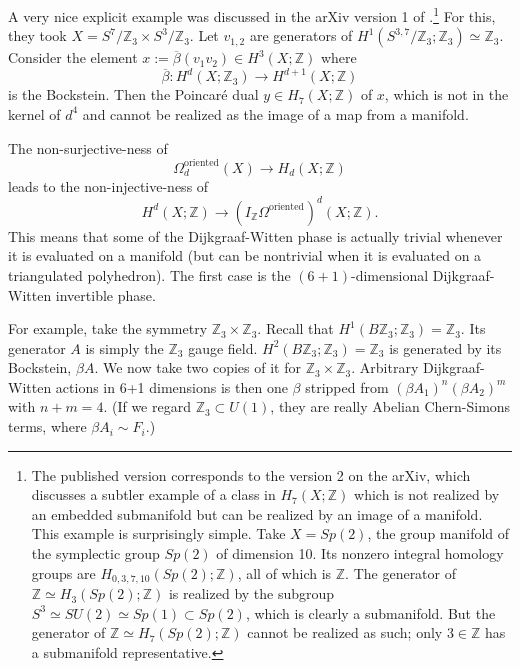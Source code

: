 \documentclass[12pt]{article}
\numberwithin{equation}{section}
\numberwithin{figure}{section}
\theoremstyle{remark}
\def\bZ{\mathbb{Z}}
\let\bar\overline
\def\BZ{\bZ}
\begin{document}
A very nice explicit example was discussed in the arXiv version 1 of \cite{BHK}.\footnote{%
The published version corresponds to the version 2 on the arXiv,
which discusses a subtler example of a class in $H_7(X;\bZ)$ which is not realized by an embedded submanifold
but can be realized by an image of a manifold.
This example is surprisingly simple. Take $X=Sp(2)$, the group manifold of the symplectic group $Sp(2)$ of dimension 10.
Its nonzero integral homology groups are $H_{0,3,7,10}(Sp(2);\bZ)$, all of which is $\bZ$.
The generator of $\bZ\simeq H_3(Sp(2);\bZ)$ is realized by the subgroup $S^3\simeq SU(2)\simeq Sp(1)\subset Sp(2)$,
which is clearly a submanifold.
But the generator of $\bZ\simeq H_7(Sp(2);\bZ)$ cannot be realized as such; only $3\in \bZ$ has a submanifold representative.
}
For this, they took $X=S^7/\bZ_3 \times S^3/\bZ_3$.
Let  $v_{1,2}$ are generators of $H^1(S^{3,7}/\bZ_3;\bZ_3)\simeq \bZ_3$.
Consider the element $x:=\bar\beta(v_1v_2)\in H^3(X;\bZ)$ where 
\begin{equation}
\bar\beta\colon H^d(X;\bZ_3)\to H^{d+1}(X;\bZ)
\end{equation} is the Bockstein.
Then the Poincar\'e dual $y\in H_7(X;\bZ)$ of $x$, which is not in the kernel of $d^4$ and cannot be realized 
as  the image of a map from a manifold.

The non-surjective-ness of 
\begin{equation}
\Omega^\text{oriented}_d(X)\to H_d(X;\bZ)
\end{equation}
leads to the non-injective-ness of 
\begin{equation}
H^d(X;\bZ)\to (I_\bZ \Omega^\text{oriented})^d(X;\bZ).
\end{equation}
This means that some of the Dijkgraaf-Witten phase is actually trivial
whenever it is evaluated on a manifold (but can be nontrivial when it is evaluated on a triangulated polyhedron).
The first case is the $(6+1)$-dimensional Dijkgraaf-Witten invertible phase.

For example, take the symmetry $\bZ_3\times \bZ_3$.
Recall that $H^1(B\BZ_3;\bZ_3)=\bZ_3$. Its generator $A$ is simply the $\bZ_3$ gauge field.
$H^2(B\bZ_3;\bZ_3)=\bZ_3$ is generated by its Bockstein, $\beta A$.
We now take two copies of it for $\bZ_3\times \bZ_3$.
Arbitrary Dijkgraaf-Witten actions in 6+1 dimensions is then 
one $\beta$ stripped from 
$(\beta A_1)^n (\beta A_2)^m$ with $n+m=4$.
(If we regard $\bZ_3\subset  U(1)$, they are really Abelian Chern-Simons terms, where $\beta A_i\sim F_i$.)
\end{document}
